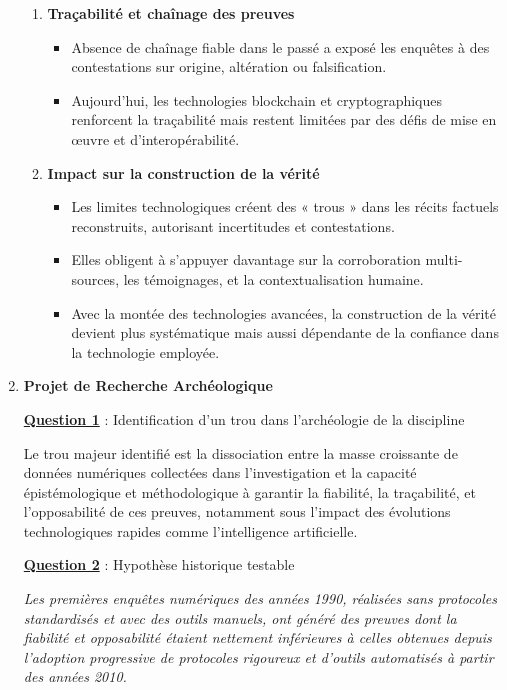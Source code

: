 \documentclass[12pt, a4paper]{article}
\newcommand{\question}[1]{\textbf{\underline{Question #1}}}
\begin{document}
\begin{enumerate}[label=\textbf{\arabic*.}, start=6]
\begin{enumerate}
			\item \textbf{Traçabilité et chaînage des preuves}
			\begin{itemize}
				\item Absence de chaînage fiable dans le passé a exposé les enquêtes à des contestations sur origine, altération ou falsification.
				\item Aujourd'hui, les technologies blockchain et cryptographiques renforcent la traçabilité mais restent limitées par des défis de mise en œuvre et d'interopérabilité.
			\end{itemize}
			
			\item \textbf{Impact sur la construction de la vérité}
			\begin{itemize}
				\item Les limites technologiques créent des « trous » dans les récits factuels reconstruits, autorisant incertitudes et contestations.
				\item Elles obligent à s'appuyer davantage sur la corroboration multi-sources, les témoignages, et la contextualisation humaine.
				\item Avec la montée des technologies avancées, la construction de la vérité devient plus systématique mais aussi dépendante de la confiance dans la technologie employée.
			\end{itemize}
		\end{enumerate}
		
		\item \textbf{Projet de Recherche Archéologique}
		
		\question{1} : Identification d'un trou dans l'archéologie de la discipline
		
		Le trou majeur identifié est la dissociation entre la masse croissante de données numériques collectées dans l'investigation et la capacité épistémologique et méthodologique à garantir la fiabilité, la traçabilité, et l'opposabilité de ces preuves, notamment sous l'impact des évolutions technologiques rapides comme l'intelligence artificielle.
		
		\question{2} : Hypothèse historique testable
		
		\textit{Les premières enquêtes numériques des années 1990, réalisées sans protocoles standardisés et avec des outils manuels, ont généré des preuves dont la fiabilité et opposabilité étaient nettement inférieures à celles obtenues depuis l'adoption progressive de protocoles rigoureux et d'outils automatisés à partir des années 2010.}
		

\end{enumerate}
\end{document}

